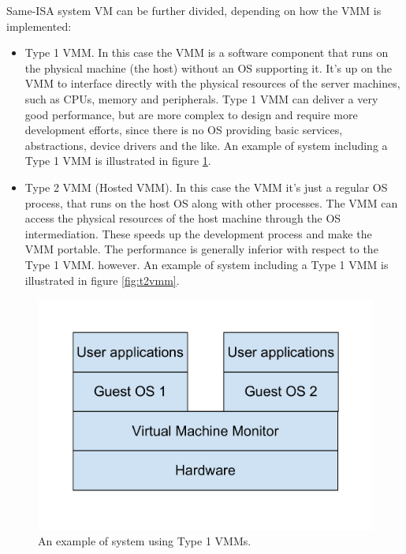 Same-ISA system VM can be further divided, depending on how the VMM is implemented:
\begin{itemize}
    \item Type 1 VMM. In this case the VMM is a software component that runs on the physical machine (the host) without an OS
	  supporting it. It's up on the VMM to interface directly with the physical resources of the server machines, such as
	  CPUs, memory and peripherals. Type 1 VMM can deliver a very good performance, but are more complex to design and require
	  more development efforts, since there is no OS providing basic services, abstractions, device drivers and the like.
	  An example of system including a Type 1 VMM is illustrated in figure \ref{fig:t1vmm}.
	  
    \item Type 2 VMM (Hosted VMM). In this case the VMM it's just a regular OS process, that runs on the host OS along with other
	  processes. The VMM can access the physical resources of the host machine through the OS intermediation. These speeds up
	  the development process and make the VMM portable. The performance is generally inferior with respect to the Type 1 VMM.
	  however. An example of system including a Type 1 VMM is illustrated in figure \ref{fig:t2vmm}.
\end{itemize}

\begin{figure}[bt]
\centering
\includegraphics[scale = 0.45]{type-1-vmm.pdf}
\caption{An example of system using Type 1 VMMs.}
\label{fig:t1vmm}
\end{figure}

